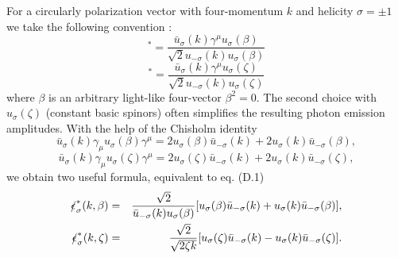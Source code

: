 For a circularly polarization vector with four-momentum $k$ and helicity $\sigma=\pm 1$ we take the following convention \cite{ChnMag}:
\begin{equation*}
[\epsilon^\mu_\sigma(\beta)]^\ast=\frac{\bar{u}_\sigma(k)\gamma^\mu u_\sigma(\beta)}{\sqrt{2}u_{-\sigma}(k)u_\sigma(\beta)}
\end{equation*}
\begin{equation}
[\epsilon^\mu_\sigma(\zeta)]^\ast=\frac{\bar{u}_\sigma(k)\gamma^\mu u_\sigma(\zeta)}{\sqrt{2}u_{-\sigma}(k)u_\sigma(\zeta)}
\end{equation} 
where  $\beta$ is an arbitrary light-like four-vector $\beta^2=0$. The second choice with $u_\sigma(\zeta)$ (constant basic spinors) often simplifies the resulting photon emission amplitudes. With the help of the Chisholm identity
\begin{equation}
\bar{u}_\sigma(k)\gamma_\mu u_\sigma(\beta)\gamma^\mu=2u_\sigma(\beta)\bar{u}_{-\sigma}(k)+2u_\sigma(k)\bar{u}_{-\sigma}(\beta),
\end{equation}
\begin{equation}
\bar{u}_\sigma(k)\gamma_\mu u_\sigma(\zeta)\gamma^\mu=2u_\sigma(\zeta)\bar{u}_{-\sigma}(k)+2u_\sigma(k)\bar{u}_{-\sigma}(\zeta),
\end{equation}
we obtain two useful formula, equivalent to eq. (D.1)
\begin{eqnarray}
\slashed\epsilon^\ast_\sigma(k,\beta)&=&\frac{\sqrt{2}}{\bar{u}_{-\sigma}(k)u_\sigma(\beta)}[u_\sigma(\beta)\bar{u}_{-\sigma}(k)+u_\sigma(k)\bar{u}_{-\sigma}(\beta)],\nonumber\\
\slashed\epsilon^\ast_\sigma(k,\zeta)&=&\frac{\sqrt{2}}{\sqrt{2\zeta k}}[u_\sigma(\zeta)\bar{u}_{-\sigma}(k)-u_\sigma(k)\bar{u}_{-\sigma}(\zeta)].
\end{eqnarray}

